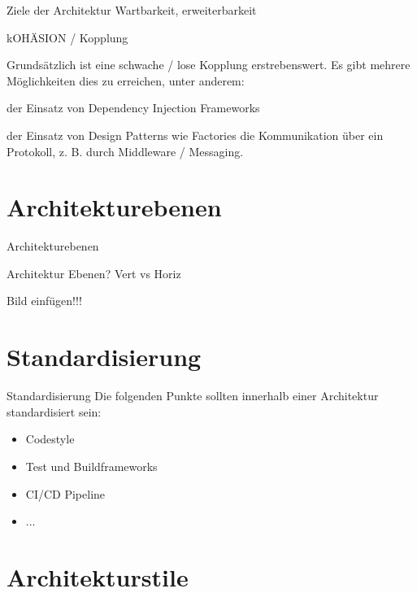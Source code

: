 \documentclass{beamer}
\begin{document}
\begin{frame}{Ziele der Architektur}
	Wartbarkeit, erweiterbarkeit

	kOHÄSION / Kopplung

	Grundsätzlich ist eine schwache / lose Kopplung erstrebenswert. Es gibt mehrere Möglichkeiten dies zu erreichen, unter anderem:

	der Einsatz von Dependency Injection Frameworks

	der Einsatz von Design Patterns wie Factories
	die Kommunikation über ein Protokoll, z. B. durch Middleware / Messaging.
\end{frame}

\section{Architekturebenen}

\begin{frame}{Architekturebenen}

	Architektur Ebenen? Vert vs Horiz

	Bild einfügen!!!

\end{frame}

\section{Standardisierung}

\begin{frame}{Standardisierung}
	Die folgenden Punkte sollten innerhalb einer Architektur standardisiert sein:

	\begin{itemize}
		\item Codestyle
		\item Test und Buildframeworks
		\item CI/CD Pipeline
		\item ...
	\end{itemize}
\end{frame}

\section{Architekturstile}
\end{document}
